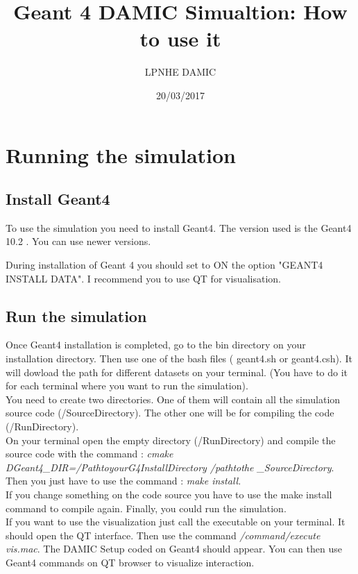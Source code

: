 \documentclass[français,final,twoside,12pt]{article}
\title{Geant 4 DAMIC Simualtion: How to use it}
\author{LPNHE DAMIC}
\date{20/03/2017}
\begin{document}
\maketitle

\section{Running the simulation}
\subsection{Install Geant4}

To use the simulation you need to install Geant4. The version used is the Geant4 10.2 .  You can use newer versions. 

During installation of Geant 4 you should set to ON the option "GEANT4 INSTALL DATA". I recommend you to use QT for visualisation.  

\subsection{Run the simulation}


Once Geant4 installation is completed, go to the bin directory on your installation directory. Then use one of the bash files ( geant4.sh or geant4.csh). It will dowload the path for different datasets on your terminal. (You have to do it for each terminal where you want to run the simulation). \\


You need to create two directories. One of them will contain all the simulation source code (/SourceDirectory). The other one will be for compiling the code (/RunDirectory). \\

On your terminal open the empty directory (/RunDirectory) and compile the source code with the command : \textit{cmake \-DGeant4\_DIR=/PathtoyourG4InstallDirectory /pathtothe \_SourceDirectory}.
Then you just have to use the command : \textit{make install}.\\

If you change something on the code source you have to use the make install command to compile again. 
Finally, you could run the simulation.\\

If you want to use the visualization just call the executable on your terminal. It should open the QT interface. Then use the command \textit{/command/execute vis.mac}. The DAMIC Setup coded on Geant4 should appear. You can then use Geant4 commands on QT browser to visualize interaction.\\
\end{document}
